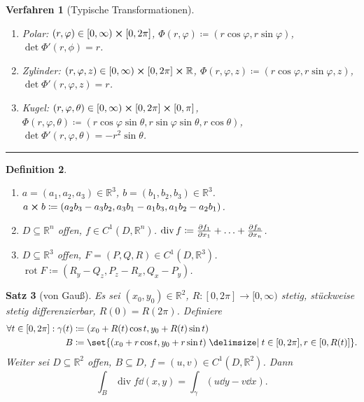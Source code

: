 \documentclass[a4paper]{article}
\newcounter{Sec}
\theoremstyle{marginbreak}
\newtheorem{definition}{Definition}[Sec]
\newtheorem{satz}[definition]{Satz}
\newtheorem{verfahren}[definition]{Verfahren}
\newcommand{\sep}{%
	\rule{\textwidth}{0.3pt}%
	\stepcounter{Sec}%
	}
\newcommand{\R}{\mathbb{R}}
\DeclareMathOperator{\ddiv}{div}
\DeclareMathOperator{\rot}{rot}
\begin{document}
	\begin{verfahren}[Typische Transformationen]
		\begin{enumerate}[label=(\alph*)]
			\item Polar: $(r,\varphi)\in [0,\infty)\cross[0,2\pi]$, $\Phi(r, \varphi)\coloneqq (r\cos\varphi, r\sin\varphi)$, $\det\Phi'(r,\phi)=r$.
			\item Zylinder: $(r, \varphi, z)\in [0,\infty)\cross [0,2\pi]\cross\R$, $\Phi(r, \varphi, z)\coloneqq(r\cos\varphi, r\sin\varphi, z)$,
				$\det\Phi'(r, \varphi, z)=r$.
			\item Kugel: $(r, \varphi,\theta)\in [0,\infty)\cross[0,2\pi]\cross[0,\pi]$,
				$\Phi(r, \varphi,\theta)\coloneqq(r\cos\varphi\sin\theta, r\sin\varphi\sin\theta, r\cos\theta)$,
				$\det\Phi'(r, \varphi, \theta)=-r^2\sin\theta$.
		\end{enumerate}
	\end{verfahren}
	\sep
	\begin{definition}
		\begin{enumerate}[label=(\alph*)]
			\item $a=(a_1, a_2, a_3)\in\R^3$, $b=(b_1, b_2, b_3)\in\R^3$. $a\cross b\coloneqq (a_2b_3-a_3b_2, a_3b_1 - a_1b_3, a_1b_2 - a_2b_1)$.
			\item $D\subseteq \R^n$ offen, $f\in C^1(D,\R^n)$. $\ddiv f\coloneqq \pdv{f_1}{x_1} + \ldots + \pdv{f_n}{x_n}$.
			\item $D\subseteq \R^3$ offen, $F=(P, Q, R)\in C^1(D, \R^3)$. $\rot F\coloneqq (R_y-Q_z, P_z-R_x,Q_x-P_y)$.
		\end{enumerate}
	\end{definition}
	\begin{satz}[von Gauß]
		Es sei $(x_0, y_0)\in\R^2$, $R\colon[0, 2\pi]\to[0,\infty)$ stetig, stückweise stetig differenzierbar, $R(0) = R(2\pi)$. Definiere
		\begin{align*}
			\forall t\in[0,2\pi]: \gamma(t)&\coloneqq (x_0 + R(t)\cos t, y_0+R(t)\sin t)\\
			B&\coloneqq\set{(x_0+r\cos t, y_0+r\sin t)\given t\in[0, 2\pi], r\in[0, R(t)]}.
		\end{align*}
		Weiter sei $D\subseteq\R^2$ offen, $B\subseteq D$, $f=(u, v)\in C^1(D,\R^2)$. Dann
		\[
			\int_B\ddiv f\dd{(x, y)} = \int_\gamma(u\dd{y} - v\dd{x}).
		\]
	\end{satz}
\end{document}
